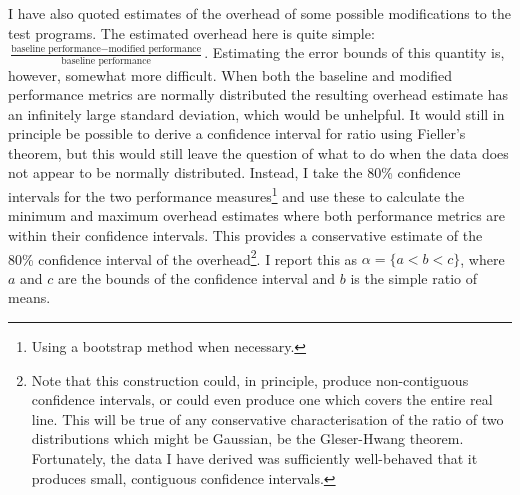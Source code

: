 I have also quoted estimates of the overhead of some possible
modifications to the test programs.  The estimated overhead here is
quite simple: $\frac{\textrm{baseline performance} - \textrm{modified
    performance}}{\textrm{baseline performance}}$.  Estimating the error bounds of this quantity is,
however, somewhat more difficult.  When both the baseline and modified
performance metrics are normally distributed the resulting overhead
estimate has an infinitely large standard deviation, which would be unhelpful.  It would still in
principle be possible to derive a confidence interval for ratio using
Fieller's theorem\needCite{}, but this would still leave the question
of what to do when the data does not appear to be normally
distributed.  Instead, I take the 80\%
confidence intervals for the two performance measures\footnote{Using a
  bootstrap method when necessary.} and use these to calculate the minimum and maximum overhead
estimates where both performance metrics are within their confidence
intervals.  This provides a conservative estimate of the 80\%
confidence interval of the overhead\footnote{Note that this
  construction could, in principle, produce non-contiguous confidence
  intervals, or could even produce one which covers the entire real
  line.  This will be true of any conservative characterisation of the
  ratio of two distributions which might be Gaussian, be the
  Gleser-Hwang theorem\needCite{}.  Fortunately, the data I have
  derived was sufficiently well-behaved that it produces small,
  contiguous confidence intervals.}.  I report this as $\alpha = \{a <
b < c\}$, where $a$ and $c$ are the bounds of the confidence interval
and $b$ is the simple ratio of means.    


